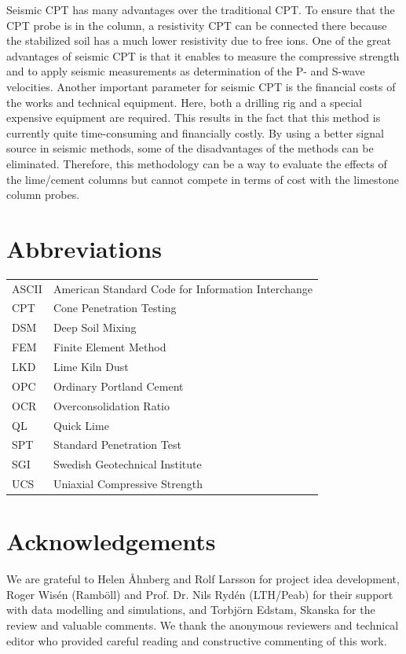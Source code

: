\documentclass[final,3p,times,onecolumn,authoryear]{elsarticle}
\begin{document}
Seismic CPT has many advantages over the traditional CPT. To ensure that the CPT probe is in the column, a resistivity CPT can be connected there because the stabilized soil has a much lower resistivity due to free ions. One of the great advantages of seismic CPT is that it enables to measure the compressive strength and to apply seismic measurements as determination of the P- and S-wave velocities. Another important parameter for seismic CPT is the financial costs of the works and technical equipment. Here, both a drilling rig and a special expensive equipment are required. This results in the fact that this method is currently quite time-consuming and financially costly. By using a better signal source in seismic methods, some of the disadvantages of the methods can be eliminated. Therefore, this methodology can be a way to evaluate the effects of the lime/cement columns but cannot compete in terms of cost with the limestone column probes.

\section{Abbreviations}
\begin{tabular}{@{}ll}
ASCII & American Standard Code for Information Interchange \\
CPT & Cone Penetration Testing \\
DSM & Deep Soil Mixing \\
FEM & Finite Element Method \\
LKD & Lime Kiln Dust \\
OPC & Ordinary Portland Cement \\
OCR & Overconsolidation Ratio \\
QL & Quick Lime \\
SPT & Standard Penetration Test \\
SGI & Swedish Geotechnical Institute \\
UCS & Uniaxial Compressive Strength
\end{tabular}


\section{Acknowledgements}
We are grateful to Helen Åhnberg and Rolf Larsson for project idea development, Roger Wisén (Ramböll) and Prof. Dr. Nils Rydén (LTH/Peab) for their support with data modelling and simulations, and Torbjörn Edstam, Skanska for the review and valuable comments. We thank the anonymous reviewers and technical editor who provided careful reading and constructive commenting of this work. 
\end{document}
